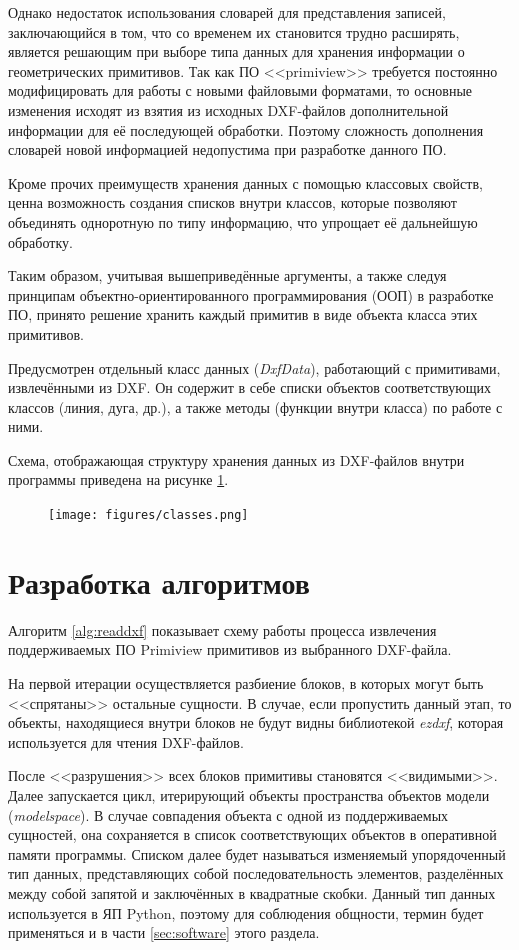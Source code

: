 Однако недостаток использования словарей для представления записей, заключающийся в том, что со временем их становится трудно расширять, является решающим при выборе типа данных для хранения информации о геометрических примитивов. Так как ПО <<primiview>> требуется постоянно модифицировать для работы с новыми файловыми форматами, то основные изменения исходят из взятия из исходных DXF-файлов дополнительной информации для её последующей обработки. Поэтому сложность дополнения словарей новой информацией недопустима при разработке данного ПО.

Кроме прочих преимуществ хранения данных с помощью классовых свойств, ценна возможность создания списков внутри классов, которые позволяют объединять одноротную по типу информацию, что упрощает её дальнейшую обработку.

Таким образом, учитывая вышеприведённые аргументы, а также следуя принципам объектно-ориентированного программирования (ООП) в разработке ПО, принято решение хранить каждый примитив в виде объекта класса этих примитивов.

Предусмотрен отдельный класс данных (\textit{DxfData}), работающий с примитивами, извлечёнными из DXF. Он содержит в себе списки объектов соответствующих классов (линия, дуга, др.), а также методы (функции внутри класса) по работе с ними.

Схема, отображающая структуру хранения данных из DXF-файлов внутри программы приведена на рисунке \ref{fig:classes}.

\begin{figure}[H]
	\centering
	\texttt{[image: figures/classes.png]}
	\label{fig:classes}
\end{figure}


\section{Разработка алгоритмов}
Алгоритм \ref{alg:readdxf} показывает схему работы процесса извлечения поддерживаемых ПО Primiview примитивов из выбранного DXF-файла.

На первой итерации осуществляется разбиение блоков, в которых могут быть <<спрятаны>> остальные сущности. В случае, если пропустить данный этап, то объекты, находящиеся внутри блоков не будут видны библиотекой \textit{ezdxf}, которая используется для чтения DXF-файлов.

После <<разрушения>> всех блоков примитивы становятся <<видимыми>>. Далее запускается цикл, итерирующий объекты пространства объектов модели (\textit{modelspace}). В случае совпадения объекта с одной из поддерживаемых сущностей, она сохраняется в список соответствующих объектов в оперативной памяти программы. Списком далее будет называться изменяемый упорядоченный тип данных, представляющих собой последовательность элементов, разделённых между собой запятой и заключённых в квадратные скобки. Данный тип данных используется в ЯП Python, поэтому для соблюдения общности, термин будет применяться и в части \ref{sec:software} этого раздела.


